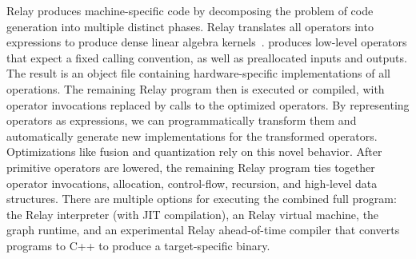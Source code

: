 Relay produces machine-specific code
    by decomposing the problem of code generation into multiple distinct phases.
Relay translates all operators into \tvm expressions
    to produce dense linear algebra kernels~\citep{tvm_osdi18, tensor_comprehensions, halide}.
\tvm produces low-level operators that expect a fixed calling convention,
    as well as preallocated inputs and outputs.
The result is an object file containing hardware-specific implementations of all
    operations.
The remaining Relay program then is executed or compiled,
    with operator invocations replaced by calls to the optimized operators.
By representing operators as \tvm expressions, we can programmatically
    transform them and automatically generate new implementations for the transformed operators.
Optimizations like fusion and quantization
    rely on this novel behavior.
After primitive operators are lowered,
    the remaining Relay program ties
    together operator invocations, allocation, control-flow,
    recursion, and high-level data structures.
There are multiple options for executing the combined full program:
    the Relay interpreter (with JIT compilation),
    an Relay virtual machine,
    the \tvm graph runtime,
    and an experimental Relay ahead-of-time compiler
    that converts programs to C++ to produce a target-specific binary.




